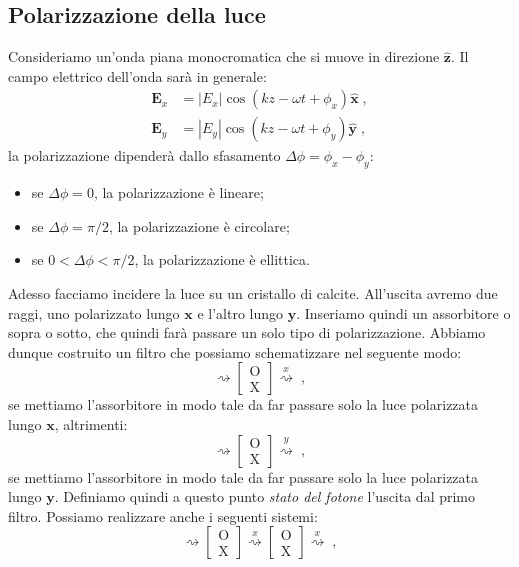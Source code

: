 \documentclass[12pt,a4paper]{report}
\theoremstyle{definition}
\numberwithin{equation}{section}
\begin{document}
\subsection*{Polarizzazione della luce}
Consideriamo un'onda piana monocromatica che si muove in direzione $\mathbf{\hat{z}}$. Il campo elettrico dell'onda sarà in generale:
\begin{align*}
\mathbf{E}_x &= |E_x|\cos(kz-\omega t+\phi_x)\mathbf{\hat{x}}\;, \\
\mathbf{E}_y &= |E_y|\cos(kz-\omega t+\phi_y)\mathbf{\hat{y}}\;,
\end{align*}
la polarizzazione dipenderà dallo sfasamento $\Delta\phi=\phi_x-\phi_y$:
\begin{itemize}
\item se $\Delta\phi=0$, la polarizzazione è lineare;
\item se $\Delta\phi=\pi/2$, la polarizzazione è circolare;
\item se $0<\Delta\phi<\pi/2$, la polarizzazione è ellittica.
\end{itemize}
Adesso facciamo incidere la luce su un cristallo di calcite. All'uscita avremo due raggi, uno polarizzato lungo $\mathbf{x}$ e l'altro lungo $\mathbf{y}$. Inseriamo quindi un assorbitore o sopra o sotto, che quindi farà passare un solo tipo di polarizzazione. Abbiamo dunque costruito un filtro che possiamo schematizzare nel seguente modo:
$$
\rightsquigarrow \left[
\begin{matrix}
\mathrm{O} \\
\mathrm{X}
\end{matrix}\right]\stackrel{x}{\rightsquigarrow}\;,
$$
se mettiamo l'assorbitore in modo tale da far passare solo la luce polarizzata lungo $\mathbf{x}$, altrimenti:
$$
\rightsquigarrow \left[
\begin{matrix}
\mathrm{O} \\
\mathrm{X}
\end{matrix}\right]\stackrel{y}{\rightsquigarrow}\;,
$$
se mettiamo l'assorbitore in modo tale da far passare solo la luce polarizzata lungo $\mathbf{y}$. Definiamo quindi a questo punto \textit{stato del fotone} l'uscita dal primo filtro. Possiamo realizzare anche i seguenti sistemi:
$$
\rightsquigarrow \left[
\begin{matrix}
\mathrm{O} \\
\mathrm{X}
\end{matrix}\right] \stackrel{x}{\rightsquigarrow}
\left[\begin{matrix}
\mathrm{O} \\
\mathrm{X}
\end{matrix}\right] \stackrel{x}{\rightsquigarrow}\;,
$$
\end{document}
